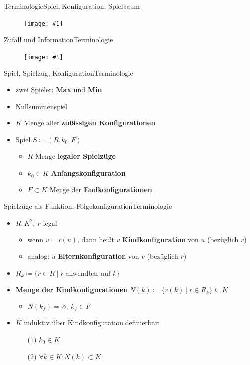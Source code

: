 \documentclass[18pt, aspectratio=169]{beamer}
\let\emptyset\varnothing
\newcommand\g[3]{%
  \begin{figure}[!ht]
  \centering
  \texttt{[image: \#1]}
  {\small#3}
  \end{figure}}
\newcommand\gw[2]{%
  \begin{figure}[!ht]
  \centering
  \texttt{[image: \#1]}
  {\small#2}
  \end{figure}}
\begin{document}

\begin{frame}{Terminologie}{Spiel, Konfiguration, Spielbaum}
  \gw{a/agenda_diagram_Term.pdf}{}
\end{frame}

\begin{frame}{Zufall und Information}{Terminologie}
	\g{img/spiel.pdf}{0.65}{}
\end{frame}

\begin{frame}{Spiel, Spielzug, Konfiguration}{Terminologie}
	\begin{itemize}
		\item zwei Spieler: \textbf{Max} und \textbf{Min}
		\pause
		\item Nullsummenspiel
		\pause
		\item $K$ \quad Menge aller \textbf{zulässigen Konfigurationen}
		\pause
		\item Spiel $S \coloneqq (R,k_0,F)$
		\begin{itemize}
			\pause
			\item $R$ \quad Menge \textbf{legaler Spielzüge}
			\pause
			\item $k_0 \in K$ \quad \textbf{Anfangskonfiguration}
			\pause
			\item $F \subset K$ \quad Menge der \textbf{Endkonfigurationen}
		\end{itemize}
	\end{itemize}	
\end{frame}

\begin{frame}{Spielzüge als Funktion, Folgekonfiguration}{Terminologie}
	\begin{itemize}
		\item $R:K^2,~r$ legal
		\pause
		\begin{itemize}
			\item wenn $v = r(u)$, dann heißt $v$ \textbf{Kindkonfiguration} von $u$ (bezüglich $r$)
			\item analog: $u$ \textbf{Elternkonfiguration} von $v$ (bezüglich $r$)
		\end{itemize}
		\pause
		\item $R_k \coloneqq \{r \in R \mid r$ anwendbar auf $k\}$
		\pause
		\item \textbf{Menge der Kindkonfigurationen} $N(k) \coloneqq \{r(k) \mid r \in R_k\} \subseteq K$
		\pause
		\begin{itemize}
			\item $N(k_f) = \emptyset,~k_f \in F$
		\end{itemize}
		\pause
		\item $K$ induktiv über Kindkonfiguration definierbar:
		\pause
		\begin{itemize}
			\item[(1)] $k_0 \in K$
			\item[(2)] $\forall k \in K: N(k) \subset K$
		\end{itemize}
	\end{itemize}
\end{frame}
\end{document}

